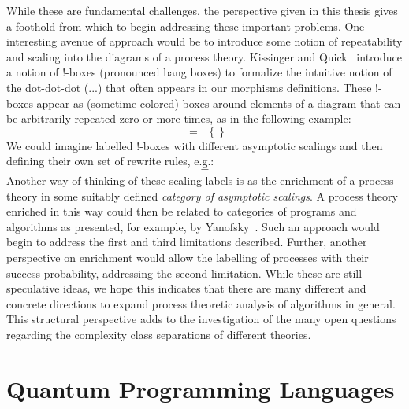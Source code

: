 While these are fundamental challenges, the perspective given in this thesis gives a foothold from which to begin addressing these important problems. One interesting avenue of approach would be to introduce some notion of repeatability and scaling into the diagrams of a process theory. Kissinger and Quick~\cite{kissinger2012pictures,kissinger2015tensors}  introduce a notion of !-boxes (pronounced bang boxes) to formalize the intuitive notion of the dot-dot-dot ($...$) that often appears in our morphisms definitions. These !-boxes appear as (sometime colored) boxes around elements of a diagram that can be arbitrarily repeated zero or more times, as in the following example:
\begin{equation}

\;=\;\;
\left\{  \right\}
\end{equation}
We could imagine labelled !-boxes with different asymptotic scalings and then defining their own set of rewrite rules, e.g.:
\begin{equation}

\;=\;

\end{equation}
Another way of thinking of these scaling labels is as the enrichment of a process theory in some suitably defined \emph{category of asymptotic scalings}. A process theory enriched in this way could then be related to categories of programs and algorithms as presented, for example, by Yanofsky~\cite{yanofsky2010towards}. Such an approach would begin to address the first and third limitations described. Further, another perspective on enrichment would allow the labelling of processes with their success probability, addressing the second limitation. While these are still speculative ideas, we hope this indicates that there are many different and concrete directions to expand process theoretic analysis of algorithms in general. This structural perspective adds to the investigation of the many open questions regarding the complexity class separations of different theories.

\section{Quantum Programming Languages}


